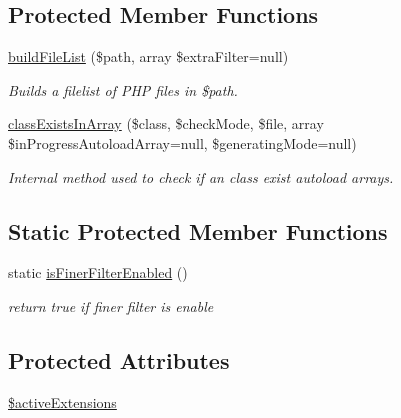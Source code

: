 \subsection*{Protected Member Functions}
\begin{DoxyCompactItemize}
\item 
\hyperlink{classextension_1_1ezadvancedautoload_1_1pv_1_1classes_1_1e_z_autoload_generator_a3ae86ef7695ac2deecb15af62207f44c}{build\-File\-List} (\$path, array \$extra\-Filter=null)
\begin{DoxyCompactList}\small\item\em Builds a filelist of P\-H\-P files in \$path. \end{DoxyCompactList}\item 
\hyperlink{classextension_1_1ezadvancedautoload_1_1pv_1_1classes_1_1e_z_autoload_generator_afc186d5d45f20bf67479407e87be6ad5}{class\-Exists\-In\-Array} (\$class, \$check\-Mode, \$file, array \$in\-Progress\-Autoload\-Array=null, \$generating\-Mode=null)
\begin{DoxyCompactList}\small\item\em Internal method used to check if an class exist autoload arrays. \end{DoxyCompactList}\end{DoxyCompactItemize}
\subsection*{Static Protected Member Functions}
\begin{DoxyCompactItemize}
\item 
static \hyperlink{classextension_1_1ezadvancedautoload_1_1pv_1_1classes_1_1e_z_autoload_generator_afd315c7aa866c6a1bfcf75ae27ce8c3b}{is\-Finer\-Filter\-Enabled} ()
\begin{DoxyCompactList}\small\item\em return true if finer filter is enable \end{DoxyCompactList}\end{DoxyCompactItemize}
\subsection*{Protected Attributes}
\begin{DoxyCompactItemize}
\item 
\hyperlink{classextension_1_1ezadvancedautoload_1_1pv_1_1classes_1_1e_z_autoload_generator_abe431f515e0a071f1ca74fd276813c19}{\$active\-Extensions}
\end{DoxyCompactItemize}
